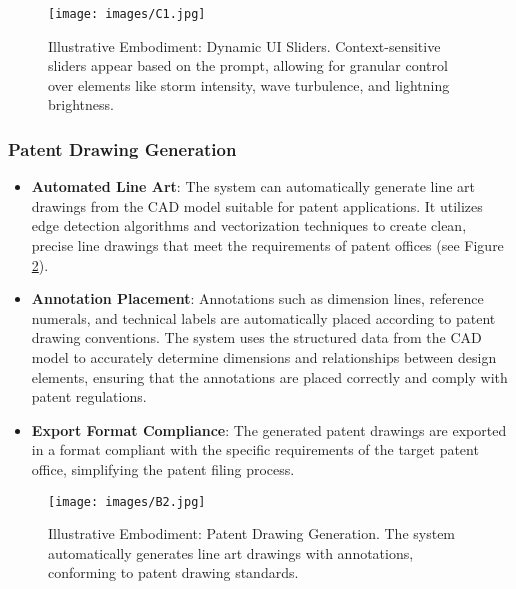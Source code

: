 \documentclass{article}
\begin{document}
\begin{figure}
\centering
\texttt{[image: images/C1.jpg]}
\caption{Illustrative Embodiment: Dynamic UI Sliders. Context-sensitive sliders appear based on the prompt, allowing for granular control over elements like storm intensity, wave turbulence, and lightning brightness.}
\label{fig:dynamic-sliders}
\end{figure}

\subsubsection{Patent Drawing Generation}
\begin{itemize}
\item \textbf{Automated Line Art}: The system can automatically generate line art drawings from the CAD model suitable for patent applications. It utilizes edge detection algorithms and vectorization techniques to create clean, precise line drawings that meet the requirements of patent offices (see Figure \ref{fig:patent-drawing}).
\item \textbf{Annotation Placement}: Annotations such as dimension lines, reference numerals, and technical labels are automatically placed according to patent drawing conventions. The system uses the structured data from the CAD model to accurately determine dimensions and relationships between design elements, ensuring that the annotations are placed correctly and comply with patent regulations.
\item \textbf{Export Format Compliance}: The generated patent drawings are exported in a format compliant with the specific requirements of the target patent office, simplifying the patent filing process.
\end{itemize}

\begin{figure}
\centering
\texttt{[image: images/B2.jpg]}
\caption{Illustrative Embodiment: Patent Drawing Generation. The system automatically generates line art drawings with annotations, conforming to patent drawing standards.}
\label{fig:patent-drawing}
\end{figure}
\end{document}
